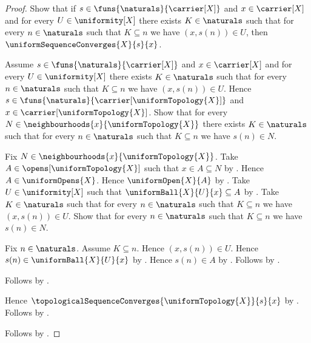 \begin{proof}
    Show that if $s\in\funs{\naturals}{\carrier[X]}$ and
        $x\in\carrier[X]$ and for every $U\in\uniformity[X]$ there exists
        $K\in\naturals$ such that for every $n\in\naturals$ such that
        $K\subseteq n$ we have $(x,s(n))\in U$, then
            $\uniformSequenceConverges{X}{s}{x}$.
    \begin{subproof}
        Assume $s\in\funs{\naturals}{\carrier[X]}$ and
            $x\in\carrier[X]$ and for every $U\in\uniformity[X]$ there
            exists $K\in\naturals$ such that for every $n\in\naturals$
            such that $K\subseteq n$ we have $(x,s(n))\in U$.
        Hence $s\in\funs{\naturals}{\carrier[\uniformTopology{X}]}$ and
            $x\in\carrier[\uniformTopology{X}]$.
        Show that for every
            $N\in\neighbourhoods{x}{\uniformTopology{X}}$ there exists
            $K\in\naturals$ such that for every $n\in\naturals$
            such that $K\subseteq n$ we have $s(n)\in N$.
        \begin{subproof}
            Fix $N\in\neighbourhoods{x}{\uniformTopology{X}}$.
            Take $A\in\opens[\uniformTopology{X}]$ such that
                $x\in A\subseteq N$ by .
            Hence $A\in\uniformOpens{X}$.
            Hence $\uniformOpen{X}{A}$ by .
            Take $U\in\uniformity[X]$ such that
                $\uniformBall{X}{U}{x}\subseteq A$
                by .
            Take $K\in\naturals$ such that for every $n\in\naturals$
                such that $K\subseteq n$ we have $(x,s(n))\in U$.
            Show that for every $n\in\naturals$ such that $K\subseteq n$
                we have $s(n)\in N$.
            \begin{subproof}
                Fix $n\in\naturals$.
                Assume $K\subseteq n$.
                Hence $(x,s(n))\in U$.
                Hence $s(n)\in\uniformBall{X}{U}{x}$
                    by .
                Hence $s(n)\in A$ by .
                Follows by .
            \end{subproof}
            Follows by \auto.
        \end{subproof}
        Hence $\topologicalSequenceConverges{\uniformTopology{X}}{s}{x}$ by
            .
        Follows by .
    \end{subproof}
    Follows by \auto.
\end{proof}

